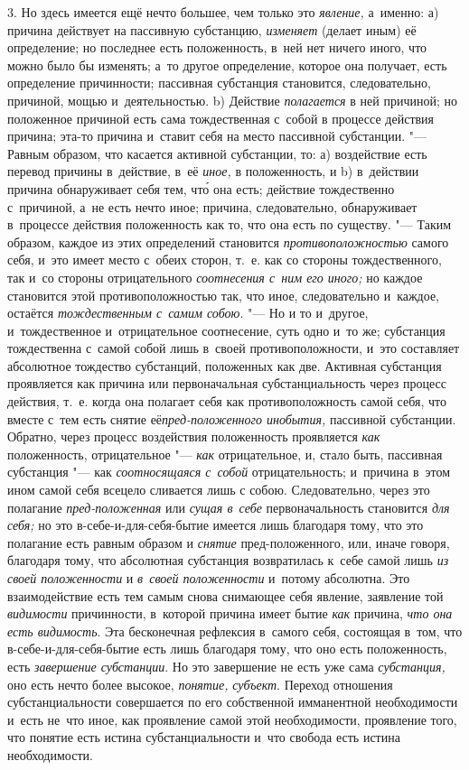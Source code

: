 3. Но здесь имеется ещё нечто большее, чем только это {\em явление,} а~именно:
а) причина действует на пассивную субстанцию, {\em изменяет} (делает
иным) её определение; но последнее есть положенность, в~ней нет ничего
иного, что можно было бы изменять; а~то другое определение, которое она
получает, есть определение причинности; пассивная субстанция становится,
следовательно, причиной, мощью и~деятельностью. b) Действие {\em полагается}
в ней причиной; но положенное причиной есть сама тождественная с~собой в
процессе действия причина; эта-то причина и~ставит себя на место пассивной
субстанции. "--- Равным образом, что касается активной субстанции, то:
а) воздействие есть перевод причины в~действие, в~её {\em иное,} в
положенность, и b) в~действии причина обнаруживает себя тем, чт\'{о} она есть;
действие тождественно с~причиной, а~не есть нечто иное; причина,
следовательно, обнаруживает в~процессе действия положенность как то, что
она есть по существу. "--- Таким образом, каждое из этих
определений становится {\em противоположностью}
самого себя, и~это имеет место с~обеих сторон, т.~е. как со стороны
тождественного, так и~со стороны отрицательного {\em соотнесения с~ним его
иного;} но каждое становится этой противоположностью так, что иное,
следовательно и~каждое, остаётся {\em тождественным с~самим собою}. "--- Но и
то и~другое, и~тождественное и~отрицательное соотнесение, суть одно и~то же;
субстанция тождественна с~самой собой лишь в~своей противоположности, и~это
составляет абсолютное тождество субстанций, положенных как две. Активная
субстанция проявляется как причина или первоначальная субстанциальность
через процесс действия, т.~е. когда она полагает себя как противоположность
самой себя, что вместе с~тем есть снятие её{\em пред-положенного инобытия,}
пассивной субстанции. Обратно, через процесс воздействия положенность
проявляется {\em как} положенность, отрицательное "--- {\em как} отрицательное,
и, стало быть, пассивная субстанция "--- как {\em соотносящаяся с~собой}
отрицательность; и~причина в~этом ином самой себя всецело сливается лишь с
собою. Следовательно, через это полагание {\em пред-положенная} или
{\em сущая в~себе} первоначальность становится {\em для себя;} но это
в-себе-и-для-себя-бытие имеется лишь благодаря тому, что это полагание есть
равным образом и {\em снятие} пред-положенного, или, иначе говоря, благодаря
тому, что абсолютная субстанция возвратилась к~себе самой лишь {\em из своей
положенности} и {\em в~своей положенности} и~потому абсолютна. Это
взаимодействие есть тем самым снова снимающее себя явление, заявление той
{\em видимости} причинности, в~которой причина имеет бытие {\em как} причина,
{\em что она есть видимость}. Эта бесконечная рефлексия в~самого себя,
состоящая в~том, что в-себе-и-для-себя-бытие есть лишь благодаря тому, что
оно есть положенность, есть {\em завершение субстанции}. Но это завершение
не есть уже сама {\em субстанция,} оно есть нечто более высокое, {\em понятие,}
{\em субъект}. Переход отношения субстанциальности совершается по его
собственной имманентной необходимости и~есть не~что иное, как проявление
самой этой необходимости, проявление того, что понятие есть истина
субстанциальности и~что свобода есть истина необходимости.

